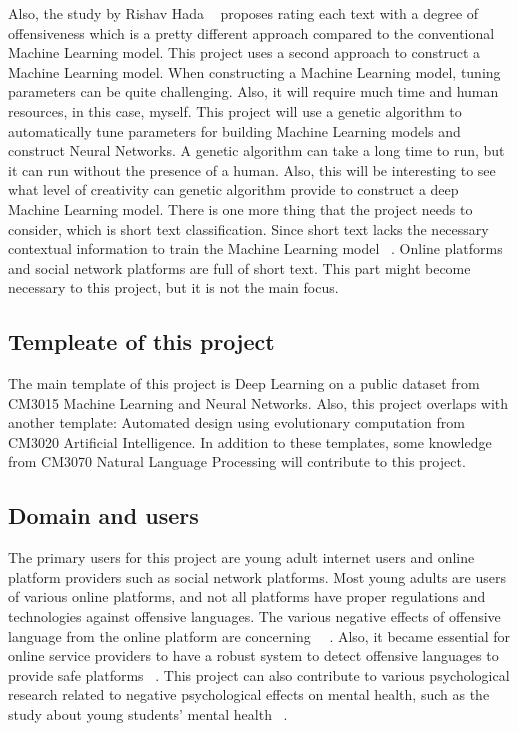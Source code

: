 \documentclass[12pt, natbib=false]{article}
\begin{document}
Also, the study by Rishav Hada ~\cite{hada2021ruddit} proposes rating each text with a degree of offensiveness which is a pretty different approach compared to the conventional Machine Learning model.
This project uses a second approach to construct a Machine Learning model.
When constructing a Machine Learning model, tuning parameters can be quite challenging.
Also, it will require much time and human resources, in this case, myself.
This project will use a genetic algorithm to automatically tune parameters for building Machine Learning models and construct Neural Networks.
A genetic algorithm can take a long time to run, but it can run without the presence of a human.
Also, this will be interesting to see what level of creativity can genetic algorithm provide to construct a deep Machine Learning model.
There is one more thing that the project needs to consider, which is short text classification.
Since short text lacks the necessary contextual information to train the Machine Learning model ~\cite{wang2021short}.
Online platforms and social network platforms are full of short text.
This part might become necessary to this project, but it is not the main focus. 

\subsection{Templeate of this project}
The main template of this project is Deep Learning on a public dataset from CM3015 Machine Learning and Neural Networks. Also, this project overlaps with another template: Automated design using evolutionary computation from CM3020 Artificial Intelligence. In addition to these templates, some knowledge from CM3070 Natural Language Processing will contribute to this project. 

\subsection{Domain and users}
The primary users for this project are young adult internet users and online platform providers such as social network platforms.
Most young adults are users of various online platforms, and not all platforms have proper regulations and technologies against offensive languages.
The various negative effects of offensive language from the online platform are concerning ~\cite{babvey2021using}~\cite{shi2021influence}.
Also, it became essential for online service providers to have a robust system to detect offensive languages to provide safe platforms ~\cite{vidgen2019challenges}.
This project can also contribute to various psychological research related to negative psychological effects on mental health, such as the study about young students’ mental health ~\cite{shi2021influence}.
\end{document}
